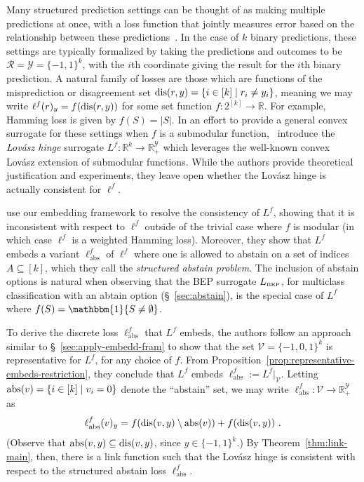\documentclass[twoside,11pt]{article}
\newcommand{\reals}{\mathbb{R}}
\newcommand{\BEP}{L_{\text{\tiny BEP}}}
\newcommand{\R}{\mathcal{R}}
\newcommand{\V}{\mathcal{V}}
\newcommand{\Y}{\mathcal{Y}}
\newcommand{\ones}{\mathbbm{1}}
\newcommand{\ellabs}{\ell_{\text{abs}}^f}
\begin{document}
Many structured prediction settings can be thought of as making multiple predictions at once, with a loss function that jointly measures error based on the relationship between these predictions~\cite{hazan2010direct, gao2011consistency, osokin2017structured}.
In the case of $k$ binary predictions, these settings are typically formalized by taking the predictions and outcomes to be $\R=\Y=\{-1,1\}^k$, with the $i$th coordinate giving the result for the $i$th binary prediction.
A natural family of losses are those which are functions of the misprediction or disagreement set $\mathrm{dis}(r,y) = \{i \in [k] \mid r_i \neq y_i\}$, meaning we may write $\ell^f(r)_y = f(\mathrm{dis}(r,y))$ for some set function $f:2^{[k]}\to\reals$.
For example, Hamming loss is given by $f(S) = |S|$.
In an effort to provide a general convex surrogate for these settings when $f$ is a submodular function,~\citet{yu2018lovasz} introduce the \emph{Lov\'asz hinge} surrogate $L^f:\reals^k\to\reals^\Y_+$ which leverages the well-known convex Lov\'asz extension of submodular functions.
While the authors provide theoretical justification and experiments, they leave open whether the Lov\'asz hinge is actually consistent for $\ell^f$.

\citet{ourlovaszpaper} use our embedding framework to resolve the consistency of $L^f$, showing that it is inconsistent with respect to $\ell^f$ outside of the trivial case where $f$ is modular (in which case $\ell^f$ is a weighted Hamming loss).
Moreover, they show that $L^f$ embeds a variant $\ellabs$ of $\ell^f$ where one is allowed to abstain on a set of indices $A \subseteq [k]$, which they call the \emph{structured abstain problem}.
The inclusion of abstain options is natural when observing that the BEP surrogate $\BEP$, for multiclass classification with an abtain option (\S~\ref{sec:abstain}), is the special case of $L^f$ where $f(S) = \ones\{S \neq \emptyset\}$.

To derive the discrete loss $\ellabs$ that $L^f$ embeds, the authors follow an approach similar to \S~\ref{sec:apply-embedd-fram} to show that the set $\V = \{-1,0,1\}^k$ is representative for $L^f$, for any choice of $f$.
From Proposition~\ref{prop:representative-embeds-restriction}, they conclude that $L^f$ embeds $\ellabs := L^f|_{\V}$.
Letting $\mathrm{abs}(v) = \{i\in[k] \mid v_i = 0\}$ denote the ``abstain'' set, we may write $\ellabs : \V \to \reals^\Y_+$ as
\begin{equation}
	\ellabs(v)_y = f(\dis(v,y) \setminus \abs(v)) + f(\dis(v,y))~.
\end{equation}
(Observe that $\mathrm{abs}(v,y) \subseteq \mathrm{dis}(v,y)$, since $y\in\{-1,1\}^k$.)
By Theorem~\ref{thm:link-main}, then, there is a link function such that the Lov\'asz hinge is consistent with respect to the structured abstain loss $\ellabs$.
\end{document}
